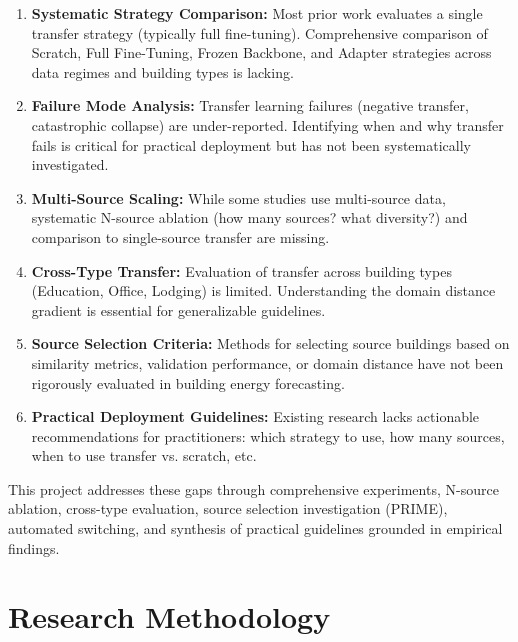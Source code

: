 \documentclass[12pt,a4paper]{report}
\begin{document}
\begin{enumerate}
    \item \textbf{Systematic Strategy Comparison:} Most prior work evaluates a single transfer strategy (typically full fine-tuning). Comprehensive comparison of Scratch, Full Fine-Tuning, Frozen Backbone, and Adapter strategies across data regimes and building types is lacking.
    
    \item \textbf{Failure Mode Analysis:} Transfer learning failures (negative transfer, catastrophic collapse) are under-reported. Identifying when and why transfer fails is critical for practical deployment but has not been systematically investigated.
    
    \item \textbf{Multi-Source Scaling:} While some studies use multi-source data, systematic N-source ablation (how many sources? what diversity?) and comparison to single-source transfer are missing.
    
    \item \textbf{Cross-Type Transfer:} Evaluation of transfer across building types (Education, Office, Lodging) is limited. Understanding the domain distance gradient is essential for generalizable guidelines.
    
    \item \textbf{Source Selection Criteria:} Methods for selecting source buildings based on similarity metrics, validation performance, or domain distance have not been rigorously evaluated in building energy forecasting.
    
    \item \textbf{Practical Deployment Guidelines:} Existing research lacks actionable recommendations for practitioners: which strategy to use, how many sources, when to use transfer vs. scratch, etc.
\end{enumerate}

This project addresses these gaps through comprehensive experiments, N-source ablation, cross-type evaluation, source selection investigation (PRIME), automated switching, and synthesis of practical guidelines grounded in empirical findings.

\chapter{Research Methodology}
\end{document}
